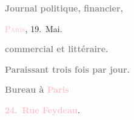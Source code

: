 \pstart
           \begin{otherlanguage}{french}\textcolor{gray}{\textbf{Journal politique, financier,}}\end{otherlanguage}\hfill \textsc{\textcolor{pink}{Paris}{}\ledrightnote{\textcolor{pink}{Paris}}}, 19. Mai.\pend
           
\pstart
           \begin{otherlanguage}{french}\textcolor{gray}{\textbf{commercial et littéraire.}}\end{otherlanguage}\pend
           
\pstart
           \begin{otherlanguage}{french}\textcolor{gray}{\textbf{\textbf{Paraissant trois fois par jour.}}}\end{otherlanguage}\pend
           
\pstart
           \begin{otherlanguage}{french}\textcolor{gray}{\textbf{\textbf{Bureau à \textcolor{pink}{Paris}{}\ledrightnote{\textcolor{pink}{Paris}}}}}\end{otherlanguage}\pend
           
\pstart
           \begin{otherlanguage}{french}\textcolor{gray}{\textbf{\textbf{\textcolor{pink}{24. Rue Feydeau}{}\ledrightnote{\textcolor{pink}{rue Feydeau}}.}}}\end{otherlanguage}\pend
           

